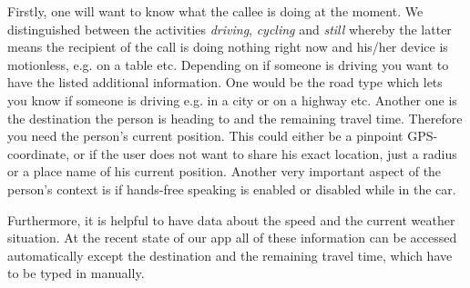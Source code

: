 \documentclass{sigchi}
\begin{document}
Firstly, one will want to know what the callee is doing at the moment. We distinguished between the activities \textit{driving}, \textit{cycling} and \textit{still} whereby the latter means the recipient of the call is doing nothing right now and his/her device is motionless, e.g. on a table etc. Depending on if someone is driving you want to have the listed additional information. One would be the road type which lets you know if someone is driving e.g. in a city or on a highway etc. Another one is the destination the person is heading to and the remaining travel time. Therefore you need the person's current position. This could either be a pinpoint GPS-coordinate, or if the user does not want to share his exact location, just a radius or a place name of his current position. Another very important aspect of the person's context is if hands-free speaking is enabled or disabled while in the car. 

Furthermore, it is helpful to have data about the speed and the current weather situation. At the recent state of our app all of these information can be accessed automatically except the destination and the remaining travel time, which have to be typed in manually.
\end{document}
